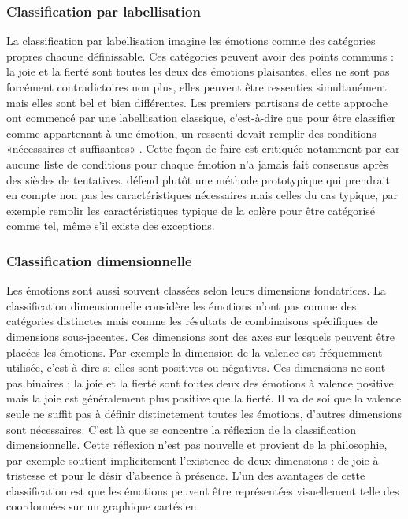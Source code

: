 \documentclass[a4paper,12pt, openany]{book}
\begin{document}
		\subsubsection{Classification par labellisation}

La classification par labellisation imagine les émotions comme des catégories propres chacune définissable. Ces catégories peuvent avoir des points communs : la joie et la fierté sont toutes les deux des émotions plaisantes, elles ne sont pas forcément contradictoires non plus, elles peuvent être ressenties simultanément mais elles sont bel et bien différentes. Les premiers partisans de cette approche ont commencé par une labellisation classique, c'est-à-dire que pour être classifier comme appartenant à une émotion, un ressenti devait remplir des conditions «\;nécessaires et suffisantes\;» \parencite{clore88}. Cette façon de faire est critiquée notamment par \textcite{russell91} car aucune liste de conditions pour chaque émotion n'a jamais fait consensus après des siècles de tentatives. \textcite{russell91} défend plutôt une méthode prototypique qui prendrait en compte non pas les caractéristiques nécessaires mais celles du cas typique, par exemple remplir les caractéristiques typique de la colère pour être catégorisé comme tel, même s'il existe des exceptions. \par 


		\subsubsection{Classification dimensionnelle}	

Les émotions sont aussi souvent classées selon leurs dimensions fondatrices. La classification dimensionnelle considère les émotions n'ont pas comme des catégories distinctes mais comme les résultats de combinaisons spécifiques de dimensions sous-jacentes. Ces dimensions sont des axes sur lesquels peuvent être placées les émotions. Par exemple la dimension de la valence est fréquemment utilisée, c'est-à-dire si elles sont positives ou négatives. Ces dimensions ne sont pas binaires ; la joie et la fierté sont toutes deux des émotions à valence positive mais la joie est généralement plus positive que la fierté. Il va de soi que la valence seule ne suffit pas à définir distinctement toutes les émotions, d'autres dimensions sont nécessaires. C'est là que se concentre la réflexion de la classification dimensionnelle. Cette réflexion n'est pas nouvelle et provient de la philosophie, par exemple \textcite{spinoza1677} soutient implicitement l'existence de deux dimensions : de joie à tristesse et pour le désir d'absence à présence. L'un des avantages de cette classification est que les émotions peuvent être représentées visuellement telle des coordonnées sur un graphique cartésien. \par 
\end{document}
